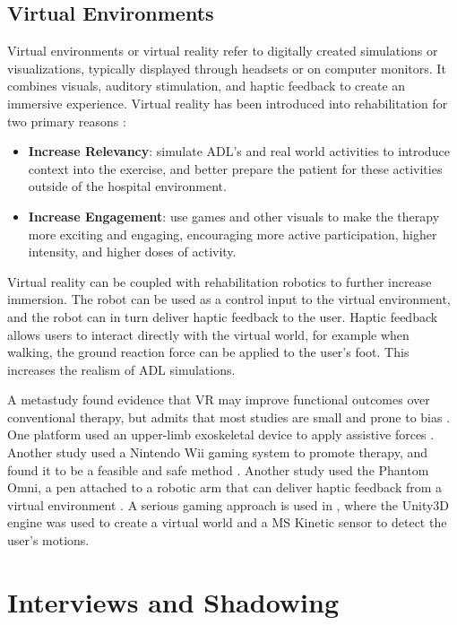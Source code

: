 \documentclass[12pt]{report}
\begin{document}
	\subsection{Virtual Environments} \label{Sec:VR}
	
	Virtual environments or virtual reality refer to digitally created simulations or visualizations, typically displayed through headsets or on computer monitors. It combines visuals, auditory stimulation, and haptic feedback to create an immersive experience. Virtual reality has been introduced into rehabilitation for two primary reasons \cite{Laver2015}:
	\begin{itemize}
		\item \textbf{Increase Relevancy}: simulate ADL's and real world activities to introduce context into the exercise, and better prepare the patient for these activities outside of the hospital environment.
		\item \textbf{Increase Engagement}: use games and other visuals to make the therapy more exciting and engaging, encouraging more active participation, higher intensity, and higher doses of activity. 
	\end{itemize}

	Virtual reality can be coupled with rehabilitation robotics to further increase immersion. The robot can be used as a control input to the virtual environment, and the robot can in turn deliver haptic feedback to the user. Haptic feedback allows users to interact directly with the virtual world, for example when walking, the ground reaction force can be applied to the user's foot. This increases the realism of ADL simulations. 
	
	A metastudy found evidence that VR may improve functional outcomes over conventional therapy, but admits that most studies are small and prone to bias \cite{Laver2015}. One platform used an upper-limb exoskeletal device to apply assistive forces  \cite{Patel2015}. Another study used a Nintendo Wii gaming system to promote therapy, and found it to be a feasible and safe method  \cite{Saposnik2010}. Another study used the Phantom Omni, a pen attached to a robotic arm that can deliver haptic feedback from a virtual environment \cite{Jiang2017}. A serious gaming approach is used in \cite{SociedadeBrasileiradeInformaticaemSaude2014}, where the Unity3D engine was used to create a virtual world and a MS Kinetic sensor to detect the user's motions. 
	
	
\section{Interviews and Shadowing}
\end{document}
